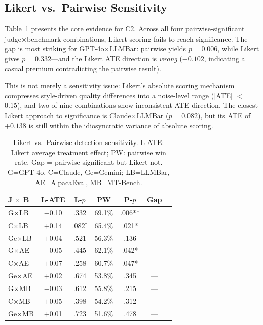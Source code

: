 \documentclass[11pt,a4paper]{article}
\newcommand{\cmark}{\checkmark}
\begin{document}
\subsection{Likert vs.\ Pairwise Sensitivity}
\label{sec:sensitivity}

Table~\ref{tab:likertvspw} presents the core evidence for C2.
Across all four pairwise-significant judge$\times$benchmark combinations, Likert scoring fails to reach significance.
The gap is most striking for GPT-4o$\times$LLMBar: pairwise yields $p{=}0.006$, while Likert gives $p{=}0.332$---and the Likert ATE direction is \emph{wrong} ($-0.102$, indicating a casual premium contradicting the pairwise result).

This is not merely a sensitivity issue: Likert's absolute scoring mechanism compresses style-driven quality differences into a noise-level range ($|$ATE$|$ $<$ 0.15), and two of nine combinations show inconsistent ATE direction.
The closest Likert approach to significance is Claude$\times$LLMBar ($p{=}0.082$), but its ATE of $+0.138$ is still within the idiosyncratic variance of absolute scoring.

\begin{table}[t]
\centering
\small
\setlength{\tabcolsep}{3pt}
\begin{tabular}{lcccccc}
\toprule
\textbf{J $\times$ B} & \textbf{L-ATE} & \textbf{L-$p$} & \textbf{PW} & \textbf{P-$p$} & \textbf{Gap} \\
\midrule
G$\times$LB & $-$0.10 & .332 & 69.1\% & .006** & \cmark \\
C$\times$LB & $+$0.14 & .082$^\dagger$ & 65.4\% & .021* & \cmark \\
Ge$\times$LB & $+$0.04 & .521 & 56.3\% & .136 & --- \\
G$\times$AE & $-$0.05 & .445 & 62.1\% & .042* & \cmark \\
C$\times$AE & $+$0.07 & .258 & 60.7\% & .047* & \cmark \\
Ge$\times$AE & $+$0.02 & .674 & 53.8\% & .345 & --- \\
G$\times$MB & $-$0.03 & .612 & 55.8\% & .215 & --- \\
C$\times$MB & $+$0.05 & .398 & 54.2\% & .312 & --- \\
Ge$\times$MB & $+$0.01 & .723 & 51.6\% & .478 & --- \\
\bottomrule
\end{tabular}
\caption{Likert vs.\ Pairwise detection sensitivity. L-ATE: Likert average treatment effect; PW: pairwise win rate. Gap = pairwise significant but Likert not. G=GPT-4o, C=Claude, Ge=Gemini; LB=LLMBar, AE=AlpacaEval, MB=MT-Bench.}
\label{tab:likertvspw}
\end{table}
\end{document}
